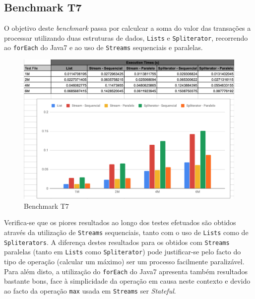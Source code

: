 \documentclass{article}
\begin{document}
\subsection{Benchmark T7}
O objetivo deste \textit{benchmark} passa por calculcar a soma do valor das transações a processar utilizando duas estruturas de dados, \texttt{Lists} e \texttt{Spliterator}, recorrendo ao \texttt{forEach} do Java7 e ao uso de \texttt{Streams} sequenciais e paralelas. 
\begin{figure}[H]
    \centering
    \includegraphics[width=15cm]{Pictures/T7.png}
    \caption{Benchmark T7}
\end{figure}
Verifica-se que os piores resultados ao longo dos testes efetuados são obtidos através da utilização de \texttt{Streams} sequenciais, tanto com o uso de \texttt{Lists} como de \texttt{Spliterators}. A diferença destes resultados para os obtidos com \texttt{Streams} paralelas (tanto em \texttt{Lists} como \texttt{Spliterator}) pode justificar-se pelo facto do tipo de operação (calcular um máximo) ser um processo facilmente paralizável. Para além disto, a utilização do \texttt{forEach} do Java7 apresenta também resultados bastante bons, face à simplicidade da operação em causa neste contexto e devido ao facto da operação
\texttt{max} usada em \texttt{Streams} ser \textit{Stateful}.

\newpage
\end{document}
